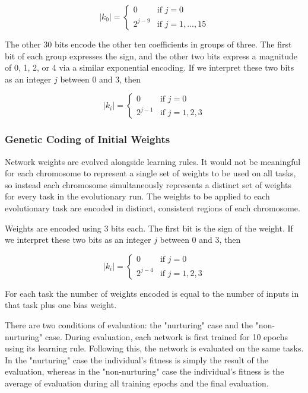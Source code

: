 \documentclass[master]{outhesis}
\begin{document}
\[
	|k_0|=
	\begin{cases}
		0 & \text{if $j = 0$}\\
		2^{j-9} & \text{if $j = 1, ..., 15$}
	\end{cases}
\]

The other 30 bits encode the other ten coefficients in groups of three. The first bit of each group expresses the sign, and the other two bits express a magnitude of 0, 1, 2, or 4 via a similar exponential encoding. If we interpret these two bits as an integer $j$ between 0 and 3, then

\[
	|k_i|=
	\begin{cases}
		0 & \text{if $j = 0$}\\
		2^{j-1} & \text{if $j = 1, 2, 3$}
	\end{cases}
\]

\subsubsection{Genetic Coding of Initial Weights}

Network weights are evolved alongside learning rules. It would not be meaningful for each chromosome to represent a single set of weights to be used on all tasks, so instead each chromosome simultaneously represents a distinct set of weights for every task in the evolutionary run. The weights to be applied to each evolutionary task are encoded in distinct, consistent regions of each chromosome. 

\newcommand{\bitsperweight}{3}
\newcommand{\jlen}{2}
\newcommand{\jmin}{0}
\newcommand{\jmax}{3}
\newcommand{\exponentshift}{4}

Weights are encoded using 3 bits each. The first bit is the sign of the weight. If we interpret these two bits as an integer $j$ between 0 and 3, then

\[
	|k_i|=
	\begin{cases}
		0 & \text{if $j = 0$}\\
		2^{j-4} & \text{if $j = 1, 2, 3$}
	\end{cases}
\]

For each task the number of weights encoded is equal to the number of inputs in that task plus one bias weight.

There are two conditions of evaluation: the "nurturing" case and the "non-nurturing" case. During evaluation, each network is first trained for 10 epochs using its learning rule. Following this, the network is evaluated on the same tasks. In the "nurturing" case the individual's fitness is simply the result of the evaluation, whereas in the "non-nurturing" case the individual's fitness is the average of evaluation during all training epochs and the final evaluation.
\end{document}
